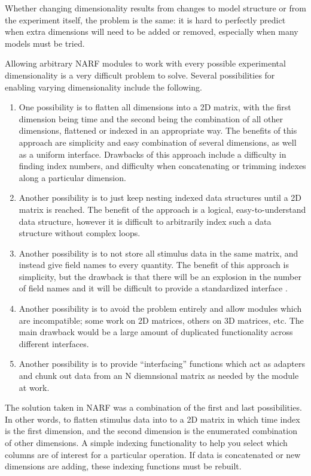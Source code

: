 \documentclass{article}
\begin{document}
Whether changing dimensionality results from changes to model structure or from the experiment itself, the problem is the same: it is hard to perfectly predict when extra dimensions will need to be added or removed, especially when many models must be tried.

Allowing arbitrary NARF modules to work with every possible experimental dimensionality is a very difficult problem to solve. Several possibilities for enabling varying dimensionality include the following.

\begin{enumerate}
  \item One possibility is to flatten all dimensions into a 2D matrix, with the first dimension being time and the second being the combination of all other dimensions, flattened or indexed in an appropriate way. The benefits of this approach are simplicity and easy combination of several dimensions, as well as a uniform interface. Drawbacks of this approach include a difficulty in finding index numbers, and difficulty when concatenating or trimming indexes along a particular dimension.
  \item Another possibility is to just keep nesting indexed data structures until a 2D matrix is reached. The benefit of the approach is a logical, easy-to-understand data structure, however it is difficult to arbitrarily index such a data structure without complex loops. 
  \item Another possibility is to not store all stimulus data in the same matrix, and instead give field names to every quantity. The benefit of this approach is simplicity, but the drawback is that there will be an explosion in the number of field names and it will be difficult to provide a standardized interface . 
  \item Another possibility is to avoid the problem entirely and allow modules which are incompatible; some work on 2D matrices, others on 3D matrices, etc. The main drawback would be a large amount of duplicated functionality across different interfaces. 
  \item Another possibility is to provide ``interfacing'' functions which act as adapters and chunk out data from an N diemnsional matrix as needed by the module at work. 
\end{enumerate}

The solution taken in NARF was a combination of the first and last possibilities. In other words, to flatten stimulus data into to a 2D matrix in which time index is the first dimension, and the second dimension is the enumerated combination of other dimensions. A simple indexing functionality to help you select which columns are of interest for a particular operation. If data is concatenated or new dimensions are adding, these indexing functions must be rebuilt. 
\end{document}
